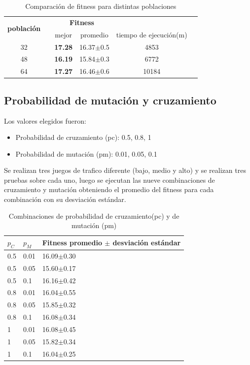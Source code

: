 \begin{table}[h]
	\renewcommand{\arraystretch}{1.2}
	\caption{Comparación de fitness para distintas poblaciones}
	\label{table:parametro_poblacion}
	\centering
	\begin{tabular}{ccrrcr}
		\hline
		\multirow{2}{*}{\textbf{población}} & & 
		\multicolumn{2}{c}{\textbf{Fitness}} \\
		\cline{3-4}
		& & \multicolumn{1}{c}{mejor} 
		& \multicolumn{1}{c}{promedio} 
		& \multicolumn{1}{c}{tiempo de ejecución(m)} \\
		\hline
		32 & & \textbf{17.28} & 16.37$\pm$0.5 & 4853\\
		48 & & \textbf{16.19} & 15.84$\pm$0.3 & 6772\\
		64 & & \textbf{17.27} & 16.46$\pm$0.6 & 10184\\
		\hline
	\end{tabular}
\end{table}




\subsection{Probabilidad de mutación y cruzamiento}

Los valores elegidos fueron:

\begin{itemize}
	\item Probabilidad de cruzamiento (pc):  0.5, 0.8, 1
	\item Probabilidad de  mutación (pm):  0.01, 0.05, 0.1
\end{itemize}

Se realizan tres juegos de trafico diferente (bajo, medio y alto) y se realizan tres pruebas sobre cada uno, luego se ejecutan las nueve combinaciones de cruzamiento y mutación obteniendo el promedio del fitness para cada combinación con su desviación estándar.


 
 \begin{table}[h]
 	\renewcommand{\arraystretch}{1.2}
 	\caption{Combinaciones de probabilidad de cruzamiento(pc) y de mutación (pm)}
 	\label{table:parametro_mutacion_cruzamiento}
 	\centering
 	\begin{tabular}{p{1cm}p{1cm}p{3.5cm} }
 		\hline
 		$p_C$& 
 		$p_M$ & 
 		Fitness promedio  $\pm$ desviación estándar\\ 
 		\hline
 		0.5 & 0.01  &  16.09$\pm$0.30\\
 		0.5 & 0.05 &  15.60$\pm$0.17\\
 		0.5 & 0.1  &  16.16$\pm$0.42\\
 		0.8 & 0.01  &  16.04$\pm$0.55\\
 		0.8 & 0.05  &  15.85$\pm$0.32\\
 		0.8 & 0.1  &  16.08$\pm$0.34\\
 		1 & 0.01 &  16.08$\pm$0.45\\
 		1 & 0.05 &  15.82$\pm$0.34\\
 		1 & 0.1 &  16.04$\pm$0.25\\
 		\hline
 	\end{tabular}
 \end{table}
 

